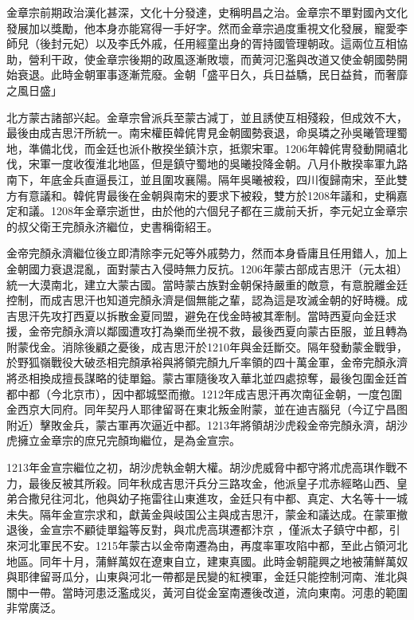 金章宗前期政治漢化甚深，文化十分發達，史稱明昌之治。金章宗不單對國內文化發展加以獎勵，他本身亦能寫得一手好字。然而金章宗過度重視文化發展，寵愛李師兒（後封元妃）以及李氏外戚，任用經童出身的胥持國管理朝政。這兩位互相協助，營利干政，使金章宗後期的政風逐漸敗壞，而黄河氾濫與改道又使金朝國勢開始衰退。此時金朝軍事逐漸荒廢。金朝「盛平日久，兵日益驕，民日益貧，而奢靡之風日盛」

北方蒙古諸部兴起。金章宗曾派兵至蒙古減丁，並且誘使互相殘殺，但成效不大，最後由成吉思汗所統一。南宋權臣韓侂冑見金朝國勢衰退，命吳璘之孙吳曦管理蜀地，準備北伐，而金廷也派仆散揆坐鎮汴京，抵禦宋軍。1206年韓侂冑發動開禧北伐，宋軍一度收復淮北地區，但是鎮守蜀地的吳曦投降金朝。八月仆散揆率軍九路南下，年底金兵直逼長江，並且圍攻襄陽。隔年吳曦被殺，四川復歸南宋，至此雙方有意議和。韓侂冑最後在金朝與南宋的要求下被殺，雙方於1208年議和，史稱嘉定和議。1208年金章宗逝世，由於他的六個兒子都在三歲前夭折，李元妃立金章宗的叔父衛王完顏永济繼位，史書稱衛紹王。

金帝完顏永濟繼位後立即清除李元妃等外戚勢力，然而本身昏庸且任用錯人，加上金朝國力衰退混亂，面對蒙古入侵時無力反抗。1206年蒙古部成吉思汗（元太祖）統一大漠南北，建立大蒙古國。當時蒙古族對金朝保持嚴重的敵意，有意脫離金廷控制，而成吉思汗也知道完顏永濟是個無能之輩，認為這是攻滅金朝的好時機。成吉思汗先攻打西夏以拆散金夏同盟，避免在伐金時被其牽制。當時西夏向金廷求援，金帝完顏永濟以鄰國遭攻打為樂而坐視不救，最後西夏向蒙古臣服，並且轉為附蒙伐金。消除後顧之憂後，成吉思汗於1210年與金廷斷交。隔年發動蒙金戰爭，於野狐嶺戰役大破丞相完顏承裕與將領完顏九斤率領的四十萬金軍，金帝完顏永濟將丞相換成擅長謀略的徒單鎰。蒙古軍隨後攻入華北並四處掠奪，最後包圍金廷首都中都（今北京市），因中都城堅而撤。1212年成吉思汗再次南征金朝，一度包圍金西京大同府。同年契丹人耶律留哥在東北叛金附蒙，並在迪吉腦兒（今辽宁昌图附近）擊敗金兵，蒙古軍再次逼近中都。1213年將領胡沙虎殺金帝完顏永濟，胡沙虎擁立金章宗的庶兄完顏珣繼位，是為金宣宗。

1213年金宣宗繼位之初，胡沙虎執金朝大權。胡沙虎威脅中都守將朮虎高琪作戰不力，最後反被其所殺。同年秋成吉思汗兵分三路攻金，他派皇子朮赤經略山西、皇弟合撒兒往河北，他與幼子拖雷往山東進攻，金廷只有中都、真定、大名等十一城未失。隔年金宣宗求和，獻黃金與岐国公主與成吉思汗，蒙金和議达成。在蒙軍撤退後，金宣宗不顧徒單鎰等反對，與朮虎高琪遷都汴京 ，僅派太子鎮守中都，引來河北軍民不安。1215年蒙古以金帝南遷為由，再度率軍攻陷中都，至此占領河北地區。同年十月，蒲鮮萬奴在遼東自立，建東真國。此時金朝龍興之地被蒲鮮萬奴與耶律留哥瓜分，山東與河北一帶都是民變的紅襖軍，金廷只能控制河南、淮北與關中一帶。當時河患泛濫成災，黃河自從金室南遷後改道，流向東南。河患的範圍非常廣泛。

